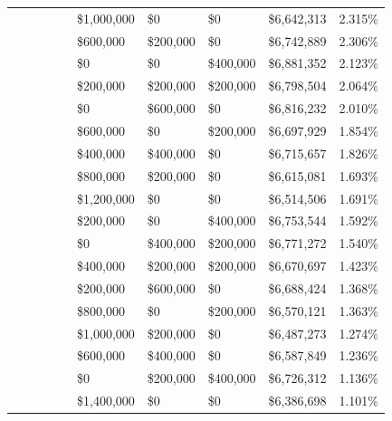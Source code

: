 \documentclass[11pt]{article}
\begin{document}
\begin{figure}
\begin{tabular}{ |p{1.0cm}p{1.0cm}p{1.0cm}p{2.0cm}|p{1.0cm}||p{1.0cm}p{1.0cm}p{1.0cm}p{2.0cm}|p{1.0cm}|}
& & & &                                            & \$1,000,000 & \$0 & \$0 & \$6,642,313 & 2.315\% \\
& & & &                                            & \$600,000 & \$200,000 & \$0 & \$6,742,889 & 2.306\% \\
& & & &                                            & \$0 & \$0 & \$400,000 & \$6,881,352 & 2.123\% \\
& & & &                                            & \$200,000 & \$200,000 & \$200,000 & \$6,798,504 & 2.064\% \\
& & & &                                            & \$0 & \$600,000 & \$0 & \$6,816,232 & 2.010\% \\
& & & &                                            & \$600,000 & \$0 & \$200,000 & \$6,697,929 & 1.854\% \\
& & & &                                            & \$400,000 & \$400,000 & \$0 & \$6,715,657 & 1.826\% \\
& & & &                                            & \$800,000 & \$200,000 & \$0 & \$6,615,081 & 1.693\% \\
& & & &                                            & \$1,200,000 & \$0 & \$0 & \$6,514,506 & 1.691\% \\
& & & &                                            & \$200,000 & \$0 & \$400,000 & \$6,753,544 & 1.592\% \\
& & & &                                            & \$0 & \$400,000 & \$200,000 & \$6,771,272 & 1.540\% \\
& & & &                                            & \$400,000 & \$200,000 & \$200,000 & \$6,670,697 & 1.423\% \\
& & & &                                            & \$200,000 & \$600,000 & \$0 & \$6,688,424 & 1.368\% \\
& & & &                                            & \$800,000 & \$0 & \$200,000 & \$6,570,121 & 1.363\% \\
& & & &                                            & \$1,000,000 & \$200,000 & \$0 & \$6,487,273 & 1.274\% \\
& & & &                                            & \$600,000 & \$400,000 & \$0 & \$6,587,849 & 1.236\% \\
& & & &                                            & \$0 & \$200,000 & \$400,000 & \$6,726,312 & 1.136\% \\
& & & &                                            & \$1,400,000 & \$0 & \$0 & \$6,386,698 & 1.101\% \\

\end{tabular}
\end{figure}
\end{document}
